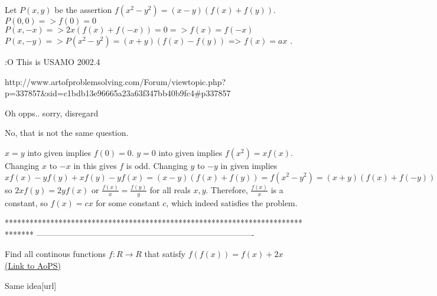 \begin{solution}
	Let $P(x,y)$ be the assertion $f(x^2-y^2)=(x-y)(f(x)+f(y))$.
$P(0,0)=> f(0)=0$
$P(x,-x) => 2x(f(x)+f(-x))=0 => f(x)=f(-x)$
$P(x,-y) => P(x^2-y^2)=(x+y)(f(x)-f(y))$
=> $f(x)=ax$ .
\end{solution}



\begin{solution}
	:O This is USAMO 2002.4

http://www.artofproblemsolving.com/Forum/viewtopic.php?p=337857&sid=c1bdb13e96665a23a63f347bb40b9fc4#p337857

Oh opps.. sorry, disregard
\end{solution}



\begin{solution}
	No, that is not the same question.
\end{solution}



\begin{solution}
	$x=y$ into given implies $f(0)=0$.
$y=0$ into given implies $f(x^2)=xf(x)$. Changing $x$ to $-x$ in this gives $f$ is odd.
Changing $y$ to $-y$ in given implies 
$xf(x)-yf(y)+xf(y)-yf(x)=(x-y)(f(x)+f(y))=f(x^2-y^2)=
(x+y)(f(x)+f(-y))= xf(x)-yf(y)-xf(y)+yf(x)$
so $2xf(y)=2yf(x)$ or $\frac{f(x)}{x}=\frac{f(y)}{y}$ for all reals $x,y$. Therefore, $\frac{f(x)}{x}$ is a constant, so $f(x)=cx$ for some constant $c$, which indeed satisfies the problem.
\end{solution}
*******************************************************************************
-------------------------------------------------------------------------------

\begin{problem}
	Find all continous functions $f:R\rightarrow R$  that satisfy
$f(f(x))=f(x)+2x$
	\flushright \href{https://artofproblemsolving.com/community/c6h463707}{(Link to AoPS)}
\end{problem}



\begin{solution}Same idea[\/url]
\end{solution}



